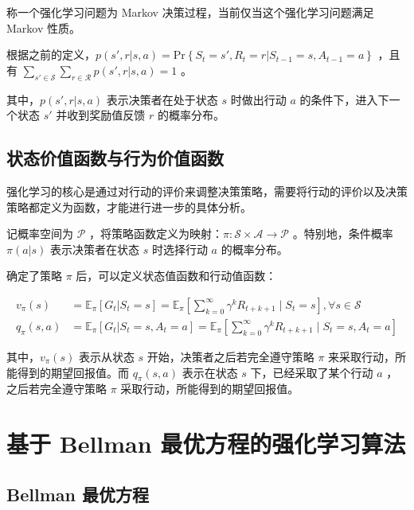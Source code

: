 \begin{definition}
    称一个强化学习问题为 Markov 决策过程，当前仅当这个强化学习问题满足 Markov 性质\cite{sutton2018reinforcement}\cite{howard1960dynamic}。
\end{definition}

根据之前的定义，$p(s',r|s,a) =\mathrm{Pr}\left\{S_t=s',R_t=r|S_{t-1}=s,A_{t-1}=a\right\}$ ，且有 $\sum_{s'\in\mathcal{S}}\sum_{r\in\mathcal{R}}p(s',r|s,a)=1$ 。

其中，$p(s',r|s,a)$ 表示决策者在处于状态 $s$ 时做出行动 $a$ 的条件下，进入下一个状态 $s'$ 并收到奖励值反馈 $r$ 的概率分布。

\subsection{状态价值函数与行为价值函数}

强化学习的核心是通过对行动的评价来调整决策策略，需要将行动的评价以及决策策略都定义为函数，才能进行进一步的具体分析。

记概率空间为 $\mathcal P$ ，将策略函数定义为映射：$\pi:\mathcal{S}\times\mathcal{A}\to \mathcal{P}$ 。特别地，条件概率 $\pi(a|s)$ 表示决策者在状态 $s$ 时选择行动 $a$ 的概率分布。

确定了策略 $\pi$ 后，可以定义状态值函数和行动值函数：

\begin{equation}
    \begin{aligned}
        v_{\pi}(s) &=\mathbb{E}_{\pi}\left[G_t|S_t=s\right]=\mathbb{E}_{\pi}\left[\sum_{k=0}^{\infty}\gamma^kR_{t+k+1}\mid S_t=s\right], \forall s \in \mathcal{S}\\
        q_{\pi}(s,a) &=\mathbb{E}_{\pi}\left[G_t|S_t=s,A_t=a\right]=\mathbb{E}_{\pi}\left[\sum_{k=0}^{\infty}\gamma^kR_{t+k+1}\mid S_t=s,A_t=a\right]
    \end{aligned}
\end{equation}

其中，$v_\pi(s)$ 表示从状态 $s$ 开始，决策者之后若完全遵守策略 $\pi$ 来采取行动，所能得到的期望回报值。而 $q_\pi(s,a)$ 表示在状态 $s$ 下，已经采取了某个行动 $a$ ，之后若完全遵守策略 $\pi$ 采取行动，所能得到的期望回报值。

\section{基于 Bellman 最优方程的强化学习算法}

\subsection{Bellman 最优方程}

